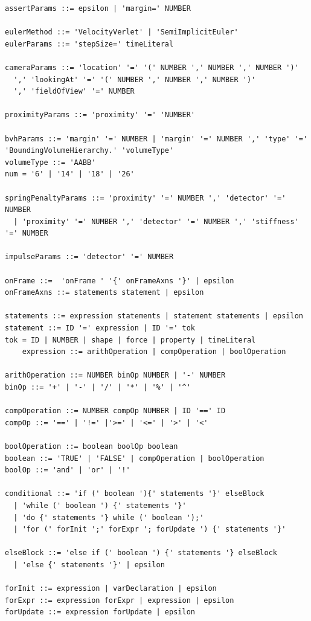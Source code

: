 \begin{verbatim}
assertParams ::= epsilon | 'margin=' NUMBER 

eulerMethod ::= 'VelocityVerlet' | 'SemiImplicitEuler'
eulerParams ::= 'stepSize=' timeLiteral

cameraParams ::= 'location' '=' '(' NUMBER ',' NUMBER ',' NUMBER ')'
  ',' 'lookingAt' '=' '(' NUMBER ',' NUMBER ',' NUMBER ')' 
  ',' 'fieldOfView' '=' NUMBER

proximityParams ::= 'proximity' '=' 'NUMBER'

bvhParams ::= 'margin' '=' NUMBER | 'margin' '=' NUMBER ',' 'type' '=' 'BoundingVolumeHierarchy.' 'volumeType'
volumeType ::= 'AABB'
num = '6' | '14' | '18' | '26'

springPenaltyParams ::= 'proximity' '=' NUMBER ',' 'detector' '=' NUMBER
  | 'proximity' '=' NUMBER ',' 'detector' '=' NUMBER ',' 'stiffness' '=' NUMBER 

impulseParams ::= 'detector' '=' NUMBER

onFrame ::=  'onFrame ' '{' onFrameAxns '}' | epsilon
onFrameAxns ::= statements statement | epsilon

statements ::= expression statements | statement statements | epsilon
statement ::= ID '=' expression | ID '=' tok
tok = ID | NUMBER | shape | force | property | timeLiteral
	expression ::= arithOperation | compOperation | boolOperation

arithOperation ::= NUMBER binOp NUMBER | '-' NUMBER
binOp ::= '+' | '-' | '/' | '*' | '%' | '^'

compOperation ::= NUMBER compOp NUMBER | ID '==' ID
compOp ::= '==' | '!=' |'>=' | '<=' | '>' | '<'

boolOperation ::= boolean boolOp boolean
boolean ::= 'TRUE' | 'FALSE' | compOperation | boolOperation
boolOp ::= 'and' | 'or' | '!'

conditional ::= 'if (' boolean '){' statements '}' elseBlock 
  | 'while (' boolean ') {' statements '}' 
  | 'do {' statements '} while (' boolean ');' 
  | 'for (' forInit ';' forExpr '; forUpdate ') {' statements '}'

elseBlock ::= 'else if (' boolean ') {' statements '} elseBlock 
  | 'else {' statements '}' | epsilon

forInit ::= expression | varDeclaration | epsilon
forExpr ::= expression forExpr | expression | epsilon
forUpdate ::= expression forUpdate | epsilon

\end{verbatim}
